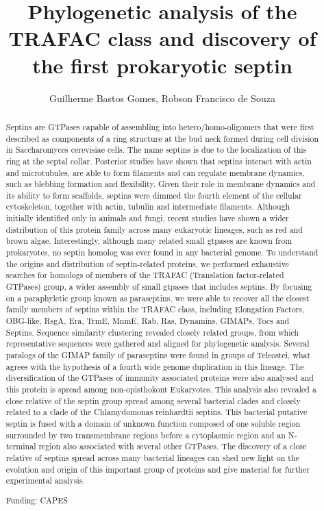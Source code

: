 \documentclass[twoside]{article}
\title{\vspace{-15mm}\fontsize{24pt}{10pt}\selectfont\textbf{ Phylogenetic analysis of the TRAFAC class and discovery of the first prokaryotic septin }} %
\author{ Guilherme Bastos Gomes, Robson Francisco de Souza }
\affil{ USP }
\date{}
\begin{document}
  
  
  \maketitle %
  
  
  \thispagestyle{fancy} %
  
  
  \begin{abstract}
  Septins are GTPases capable of assembling into hetero/homo-oligomers that  were first described as components of a ring structure at the bud neck formed during cell division in Saccharomyces cerevisiae cells. The name septins is due to the localization of this ring at the septal collar. Posterior studies have shown that septins interact with actin and microtubules,  are able to form filaments and can regulate membrane dynamics,  such as blebbing formation and flexibility. Given their role in membrane dynamics and its ability to form scaffolds,  septins were dimmed the fourth element of the cellular cytoskeleton,  together with actin,  tubulin and intermediate filaments. Although initially identified only in animals and fungi,  recent studies have shown a wider distribution of this protein family across many eukaryotic lineages,  such as red and brown algae. Interestingly,  although many related small gtpases are known from prokaryotes,  no septin homolog was ever found in any bacterial genome. To understand the origins and distribution of septin-related proteins,  we performed exhaustive searches for homologs of members of the TRAFAC (Translation factor-related GTPases) group,  a wider assembly of small gtpases that includes septins. By focusing on a paraphyletic group known as paraseptins,  we were able to recover all the closest family members of septins within the TRAFAC class,  including Elongation Factors,  OBG-like,  RsgA,  Era,  TrmE,  MnmE,  Rab,  Ras,  Dynamins,  GIMAPs,  Tocs and Septins. Sequence similarity clustering revealed closely related groups,  from which representative sequences were gathered and aligned for phylogenetic analysis. Several paralogs of the GIMAP family of paraseptins were found in groups of Teleostei,  what agrees with the hypothesis of a fourth wide genome duplication in this lineage. The diversification of the GTPases of immunity associated proteins were also analysed and this protein is spread among non-opisthokont Eukaryotes. This analysis also revealed a close relative of the septin group spread among several bacterial clades and closely related to a clade of the Chlamydomonas reinhardtii septins. This bacterial putative septin is fused with a domain of unknown function composed of one soluble region surrounded by two transmembrane regions before a cytoplasmic region and an N-terminal region also associated with several other GTPases. The discovery of a close relative of septins spread across many bacterial lineages can shed new light on the evolution and origin of this important group of proteins and give material for further experimental analysis.
  
  Funding: CAPES \\ 
  \end{abstract}
  
\end{document}
